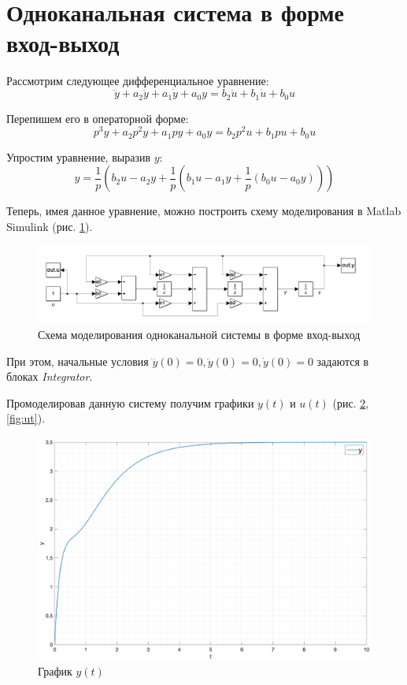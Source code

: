 \section{Одноканальная система в форме вход-выход}

Рассмотрим следующее дифференциальное уравнение:
\begin{equation}
    \label{eq:source_eq}
    \dddot{y} + a_2 \ddot{y} + a_1 \dot{y} + a_0 y = b_2 \ddot{u} + b_1 \dot{u} + b_0 u
\end{equation}

Перепишем его в операторной форме:
\begin{equation}
    \label{eq:eq2}
    p^3 y + a_2 p^2 y + a_1 p y + a_0 y = b_2 p^2 u + b_1 p u + b_0 u
\end{equation}

Упростим уравнение, выразив $y$:
\begin{equation}
    \label{eq:final_eq}
    y = \frac{1}{p}(b_2 u - a_2 y + \frac{1}{p}(b_1 u - a_1 y + \frac{1}{p}(b_0 u - a_0 y)))
\end{equation}

Теперь, имея данное уравнение, можно построить схему моделирования в Matlab Simulink (рис. \ref{fig:model1}).

\begin{figure}[ht!]
    \centering
    \includegraphics[width=\textwidth]{media/system.png}
    \caption{Схема моделирования одноканальной системы в форме вход-выход}
    \label{fig:model1}
\end{figure}

При этом, начальные условия $\dddot{y}(0) = 0, \ddot{y}(0) = 0, \dot{y}(0) = 0$ задаются в блоках \textit{Integrator}.

Промоделировав данную систему получим графики $y(t)$ и $u(t)$ (рис. \ref{fig:yt}, \ref{fig:ut}).

\begin{figure}
    \centering
    \includegraphics[width=\textwidth]{media/sys1_y(t).png}
    \caption{График $y(t)$}
    \label{fig:yt}
\end{figure}

